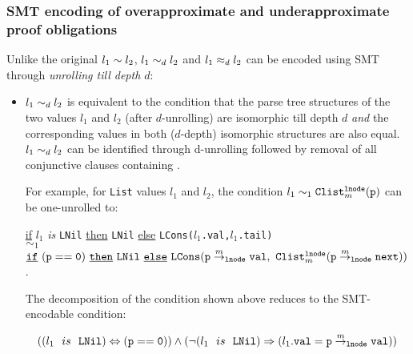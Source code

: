 \subsubsection{SMT encoding of overapproximate and underapproximate proof obligations}
\label{sec:ouapprox}
Unlike the original \recursiveRelation{} $l_1\sim{}l_2$,
$l_1\sim_dl_2$ and
$l_1\approx_dl_2$ can be encoded using SMT through {\em unrolling
till depth $d$}:
\begin{itemize}
\item $l_1\sim_dl_2$ is equivalent to the condition
that the parse tree structures
of the two values $l_1$ and $l_2$ (after $d$-unrolling)
are isomorphic till depth $d$ {\em and} the
corresponding values in both ($d$-depth)
isomorphic structures
are also equal.
$l_1\sim_dl_2$ can be identified through d-unrolling followed by removal of all conjunctive clauses containing \recursiveRelations{}.

For example, for {\tt List} values $l_1$
and $l_2$, the
condition $l_1\sim_1{\tt Clist}^{{\tt lnode}}_{m}({\tt p})$
can be one-unrolled to:
\begin{small}
\begin{center}
\underline{if} $l_1$ {\em is} {\tt LNil} \underline{then} {\tt LNil} \underline{else} {\tt LCons($l_1$.val,$l_1$.tail)}\\
$\sim_1$\\
$\mathrm{\tt \underline{if}\ (p==0)\ \underline{then}\ }{\tt LNil}\mathrm{\tt \ \underline{else}\ {\tt LCons}(}\structPointer{p}{m}{{\tt lnode}}{val},\ {\tt Clist}^{{\tt lnode}}_m(\structPointer{p}{m}{{\tt lnode}}{next}))$.
\end{center}
\end{small}
The decomposition of the
condition shown above
reduces to the SMT-encodable condition:
\begin{small}
$$
((l_1\ \ is\ \ {\tt LNil}) \Leftrightarrow {\tt (p == 0)}) \land (\neg(l_1\ \ is\ \ {\tt LNil})\Rightarrow(l_1{\tt.val}={\tt p} \overset{m}{\rightarrow}_{{\tt lnode}} {\tt val}))
$$
\end{small}




\end{itemize}
